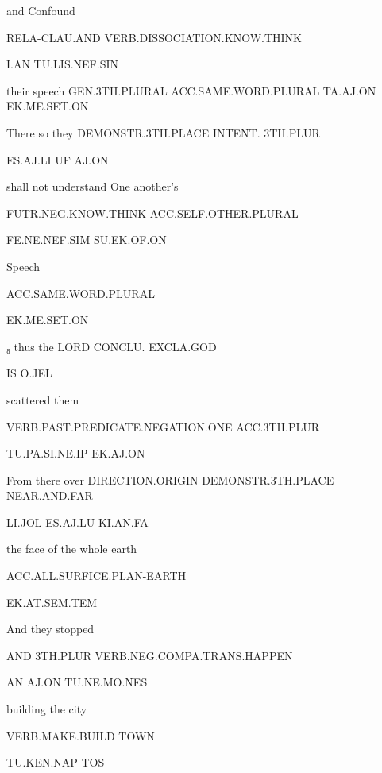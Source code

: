 { 

and  			Confound 

RELA-CLAU.AND	VERB.DISSOCIATION.KNOW.THINK 

I.AN			TU.LIS.NEF.SIN      

  

their 			speech				GEN.3TH.PLURAL             ACC.SAME.WORD.PLURAL	 	TA.AJ.ON		EK.ME.SET.ON 

  

There			so 			they 		DEMONSTR.3TH.PLACE        INTENT.		3TH.PLUR	 

ES.AJ.LI				UF		AJ.ON				 

shall not understand 		One another’s 

FUTR.NEG.KNOW.THINK		ACC.SELF.OTHER.PLURAL 

FE.NE.NEF.SIM			SU.EK.OF.ON	 

  

Speech 

ACC.SAME.WORD.PLURAL 

EK.ME.SET.ON 

 

₈ thus 		the LORD 					CONCLU.	EXCLA.GOD					 

IS		O.JEL		 

 

scattered				them 

VERB.PAST.PREDICATE.NEGATION.ONE	ACC.3TH.PLUR 

TU.PA.SI.NE.IP				EK.AJ.ON 

 

From 			there 			over 		DIRECTION.ORIGIN         DEMONSTR.3TH.PLACE  NEAR.AND.FAR 

LI.JOL			ES.AJ.LU		KI.AN.FA	 

 

 

the face of the whole earth 

ACC.ALL.SURFICE.PLAN-EARTH 

EK.AT.SEM.TEM 

 

And 	they 		stopped 				 

AND	3TH.PLUR	VERB.NEG.COMPA.TRANS.HAPPEN	 

AN	AJ.ON		TU.NE.MO.NES		                               

 

building 		the city 

VERB.MAKE.BUILD	TOWN 

TU.KEN.NAP                      TOS 

}
